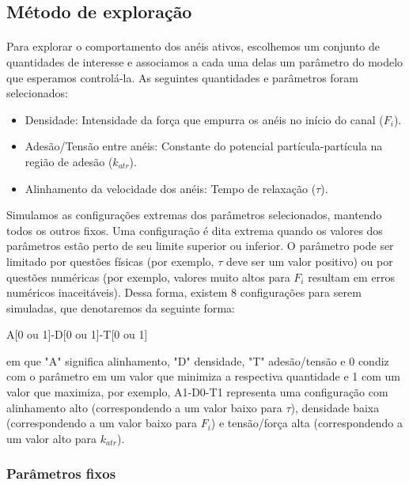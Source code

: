 \documentclass{article}
\theoremstyle{definition}
\begin{document}
\subsection{Método de exploração}
\paragraph{}
Para explorar o comportamento dos anéis ativos, escolhemos um conjunto de quantidades de interesse e associamos a cada uma delas um parâmetro do modelo que esperamos controlá-la. As seguintes quantidades e parâmetros foram selecionados: 
\begin{itemize}
    \item Densidade: Intensidade da força que empurra os anéis no início do canal ($F_i$).
    \item Adesão/Tensão entre anéis: Constante do potencial partícula-partícula na região de adesão ($k_{atr}$).
    \item Alinhamento da velocidade dos anéis: Tempo de relaxação ($\tau$).
\end{itemize}
Simulamos as configurações extremas dos parâmetros selecionados, mantendo todos os outros fixos. Uma configuração é dita extrema quando os valores dos parâmetros estão perto de seu limite superior ou inferior. O parâmetro pode ser limitado por questões físicas (por exemplo, $\tau$ deve ser um valor positivo) ou por questões numéricas (por exemplo, valores muito altos para $F_i$ resultam em erros numéricos inaceitáveis). Dessa forma, existem 8 configurações para serem simuladas, que denotaremos da seguinte forma:
\begin{center}
A[0 ou 1]-D[0 ou 1]-T[0 ou 1] 
\end{center}
em que "A" significa alinhamento, "D" densidade, "T" adesão/tensão e 0 condiz com o parâmetro em um valor que minimiza a respectiva quantidade e 1 com um valor que maximiza, por exemplo, A1-D0-T1 representa uma configuração com alinhamento alto (correspondendo a um valor baixo para $\tau$), densidade baixa (correspondendo a um valor baixo para $F_i$) e tensão/força alta (correspondendo a um valor alto para $k_{atr}$). 

\subsubsection{Parâmetros fixos}
\end{document}
